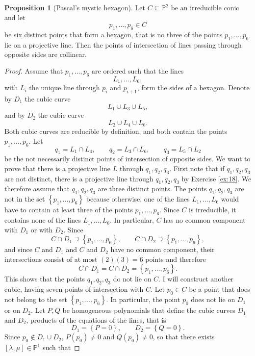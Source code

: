 \documentclass{article}
\renewcommand{\P}{\mathbb{P}}
\newcommand{\rb}[1]{\left( #1 \right)}
\renewcommand{\sb}[1]{\left[ #1 \right]}
\newcommand{\cb}[1]{\left\{ #1 \right\}}
\theoremstyle{definition}\newtheorem{definition}{Definition}[section]
\theoremstyle{definition}\newtheorem{notation}[definition]{Notation}
\theoremstyle{definition}\newtheorem{remark}[definition]{Remark}
\theoremstyle{definition}\newtheorem{example1}[definition]{Example}
\theoremstyle{definition}\newtheorem{fact}{Fact}
\theoremstyle{definition}\newtheorem{exercise}{Exercise}
\theoremstyle{definition}\newtheorem*{example2}{Example}
\newtheorem{proposition}[definition]{Proposition}
\begin{document}
\begin{proposition}[Pascal's mystic hexagon]
Let $ C \subseteq \P^2 $ be an irreducible conic and let
$$ p_1, \dots, p_6 \in C $$
be six distinct points that form a hexagon, that is no three of the points $ p_1, \dots, p_6 $ lie on a projective line. Then the points of intersection of lines passing through opposite sides are collinear.
\end{proposition}

\begin{proof}
Assume that $ p_1, \dots, p_6 $ are ordered such that the lines
$$ L_1, \dots, L_6, $$
with $ L_i $ the unique line through $ p_i $ and $ p_{i + 1} $, form the sides of a hexagon. Denote by $ D_1 $ the cubic curve
$$ L_1 \cup L_3 \cup L_5, $$
and by $ D_2 $ the cubic curve
$$ L_2 \cup L_4 \cup L_6. $$
Both cubic curves are reducible by definition, and both contain the points $ p_1, \dots, p_6 $. Let
$$ q_1 = L_1 \cap L_4, \qquad q_2 = L_3 \cap L_6, \qquad q_3 = L_5 \cap L_2 $$
be the not necessarily distinct points of intersection of opposite sides. We want to prove that there is a projective line $ L $ through $ q_1, q_2, q_3 $. First note that if $ q_1, q_2, q_3 $ are not distinct, there is a projective line through $ q_1, q_2, q_3 $ by Exercise \ref{ex:18}. We therefore assume that $ q_1, q_2, q_3 $ are three distinct points. The points $ q_1, q_2, q_3 $ are not in the set $ \cb{p_1, \dots, p_6} $ because otherwise, one of the lines $ L_1, \dots, L_6 $ would have to contain at least three of the points $ p_1, \dots, p_6 $. Since $ C $ is irreducible, it contains none of the lines $ L_1, \dots, L_6 $. In particular, $ C $ has no common component with $ D_1 $ or with $ D_2 $. Since
$$ C \cap D_1 \supseteq \cb{p_1, \dots, p_6}, \qquad C \cap D_2 \supseteq \cb{p_1, \dots, p_6}, $$
and since $ C $ and $ D_1 $ and $ C $ and $ D_2 $ have no common component, their intersections consist of at most $ \rb{2}\rb{3} = 6 $ points and therefore
$$ C \cap D_1 = C \cap D_2 = \cb{p_1, \dots, p_6}. $$
This shows that the points $ q_1, q_2, q_3 $ do not lie on $ C $. I will construct another cubic, having seven points of intersection with $ C $. Let $ p_0 \in C $ be a point that does not belong to the set $ \cb{p_1, \dots, p_6} $. In particular, the point $ p_0 $ does not lie on $ D_1 $ or on $ D_2 $. Let $ P, Q $ be homogeneous polynomials that define the cubic curves $ D_1 $ and $ D_2 $, products of the equations of the lines, that is
$$ D_1 = \cb{P = 0}, \qquad D_2 = \cb{Q = 0}. $$
Since $ p_0 \notin D_1 \cup D_2 $, $ P\rb{p_0} \ne 0 $ and $ Q\rb{p_0} \ne 0 $, so that there exists $ \sb{\lambda, \mu} \in \P^1 $ such that

\end{proof}
\end{document}
